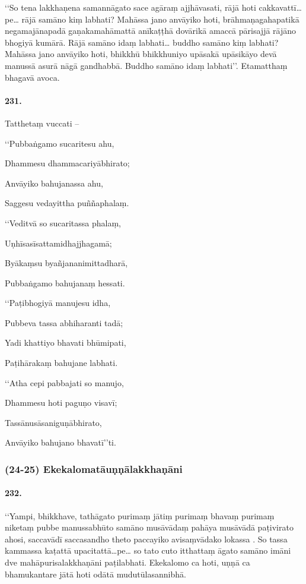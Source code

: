 ‘‘So tena lakkhaṇena samannāgato sace agāraṃ ajjhāvasati, rājā hoti cakkavattī…pe… rājā samāno kiṃ labhati? Mahāssa jano anvāyiko hoti, brāhmaṇagahapatikā negamajānapadā gaṇakamahāmattā anīkaṭṭhā dovārikā amaccā pārisajjā rājāno bhogiyā kumārā. Rājā samāno idaṃ labhati… buddho samāno kiṃ labhati? Mahāssa jano anvāyiko hoti, bhikkhū bhikkhuniyo upāsakā upāsikāyo devā manussā asurā nāgā gandhabbā. Buddho samāno idaṃ labhati’’. Etamatthaṃ bhagavā avoca.

\paragraph{231.} Tatthetaṃ vuccati –

‘‘Pubbaṅgamo sucaritesu ahu,

Dhammesu dhammacariyābhirato;

Anvāyiko bahujanassa ahu,

Saggesu vedayittha puññaphalaṃ.

‘‘Veditvā so sucaritassa phalaṃ,

Uṇhīsasīsattamidhajjhagamā;

Byākaṃsu byañjananimittadharā,

Pubbaṅgamo bahujanaṃ hessati.

‘‘Paṭibhogiyā manujesu idha,

Pubbeva tassa abhiharanti tadā;

Yadi khattiyo bhavati bhūmipati,

Paṭihārakaṃ bahujane labhati.

‘‘Atha cepi pabbajati so manujo,

Dhammesu hoti paguṇo visavī;

Tassānusāsaniguṇābhirato,

Anvāyiko bahujano bhavatī’’ti.

\subsubsection{(24-25) Ekekalomatāuṇṇālakkhaṇāni}

\paragraph{232.} ‘‘Yampi, bhikkhave, tathāgato purimaṃ jātiṃ purimaṃ bhavaṃ purimaṃ niketaṃ pubbe manussabhūto samāno musāvādaṃ pahāya musāvādā paṭivirato ahosi, saccavādī saccasandho theto paccayiko avisaṃvādako lokassa . So tassa kammassa kaṭattā upacitattā…pe… so tato cuto itthattaṃ āgato samāno imāni dve mahāpurisalakkhaṇāni paṭilabhati. Ekekalomo ca hoti, uṇṇā ca bhamukantare jātā hoti odātā mudutūlasannibhā.

